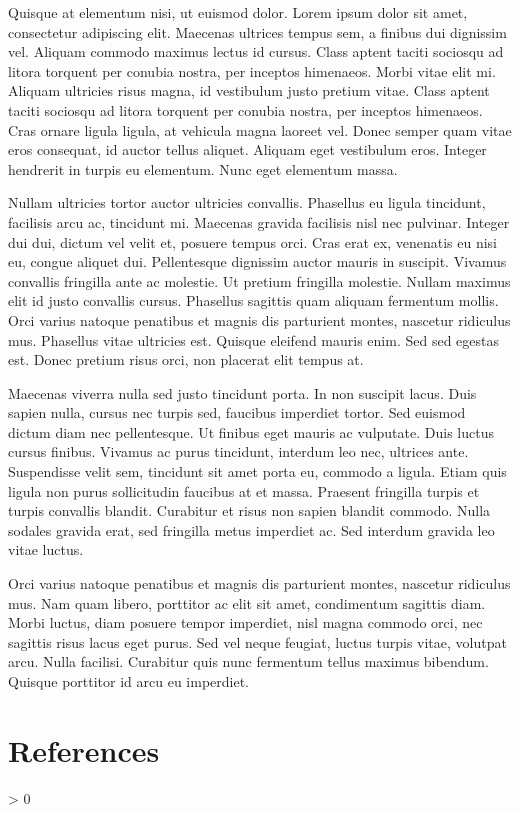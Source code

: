\documentclass[
  english,
  man,floatsintext]{apa6}
\newlength{\cslhangindent}
\newenvironment{CSLReferences}[2] %
 {%
  \setlength{\parindent}{0pt}
  \ifodd #1 \everypar{\setlength{\hangindent}{\cslhangindent}}\ignorespaces\fi
  \ifnum #2 > 0
  \setlength{\parskip}{#2\baselineskip}
  \fi
 }%
 {}
\begin{document}
Quisque at elementum nisi, ut euismod dolor. Lorem ipsum dolor sit amet, consectetur adipiscing elit. Maecenas ultrices tempus sem, a finibus dui dignissim vel. Aliquam commodo maximus lectus id cursus. Class aptent taciti sociosqu ad litora torquent per conubia nostra, per inceptos himenaeos. Morbi vitae elit mi. Aliquam ultricies risus magna, id vestibulum justo pretium vitae. Class aptent taciti sociosqu ad litora torquent per conubia nostra, per inceptos himenaeos. Cras ornare ligula ligula, at vehicula magna laoreet vel. Donec semper quam vitae eros consequat, id auctor tellus aliquet. Aliquam eget vestibulum eros. Integer hendrerit in turpis eu elementum. Nunc eget elementum massa.

Nullam ultricies tortor auctor ultricies convallis. Phasellus eu ligula tincidunt, facilisis arcu ac, tincidunt mi. Maecenas gravida facilisis nisl nec pulvinar. Integer dui dui, dictum vel velit et, posuere tempus orci. Cras erat ex, venenatis eu nisi eu, congue aliquet dui. Pellentesque dignissim auctor mauris in suscipit. Vivamus convallis fringilla ante ac molestie. Ut pretium fringilla molestie. Nullam maximus elit id justo convallis cursus. Phasellus sagittis quam aliquam fermentum mollis. Orci varius natoque penatibus et magnis dis parturient montes, nascetur ridiculus mus. Phasellus vitae ultricies est. Quisque eleifend mauris enim. Sed sed egestas est. Donec pretium risus orci, non placerat elit tempus at.

Maecenas viverra nulla sed justo tincidunt porta. In non suscipit lacus. Duis sapien nulla, cursus nec turpis sed, faucibus imperdiet tortor. Sed euismod dictum diam nec pellentesque. Ut finibus eget mauris ac vulputate. Duis luctus cursus finibus. Vivamus ac purus tincidunt, interdum leo nec, ultrices ante. Suspendisse velit sem, tincidunt sit amet porta eu, commodo a ligula. Etiam quis ligula non purus sollicitudin faucibus at et massa. Praesent fringilla turpis et turpis convallis blandit. Curabitur et risus non sapien blandit commodo. Nulla sodales gravida erat, sed fringilla metus imperdiet ac. Sed interdum gravida leo vitae luctus.

Orci varius natoque penatibus et magnis dis parturient montes, nascetur ridiculus mus. Nam quam libero, porttitor ac elit sit amet, condimentum sagittis diam. Morbi luctus, diam posuere tempor imperdiet, nisl magna commodo orci, nec sagittis risus lacus eget purus. Sed vel neque feugiat, luctus turpis vitae, volutpat arcu. Nulla facilisi. Curabitur quis nunc fermentum tellus maximus bibendum. Quisque porttitor id arcu eu imperdiet.

\newpage

\hypertarget{references}{%
\section{References}\label{references}}

\begingroup
\setlength{\parindent}{-0.5in}
\setlength{\leftskip}{0.5in}

\hypertarget{refs}{}
\begin{CSLReferences}{0}{0}
\end{CSLReferences}

\endgroup
\end{document}

